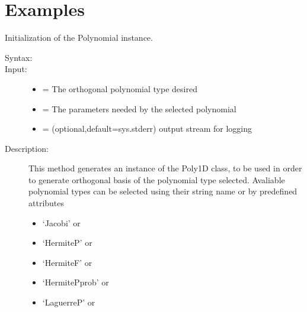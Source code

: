 \documentclass[letterpaper,10pt,english]{sphinxmanual}
\begin{document}
\chapter{Examples}
\label{index:examples}

\begin{fulllineitems}
\label{index:SpectralToolbox.Spectral1D.Poly1D}
Initialization of the Polynomial instance.
\begin{description}
\item[{Syntax:}] \leavevmode
{}

\item[{Input:}] \leavevmode\begin{itemize}
\item {} 
 = The orthogonal polynomial type desired

\item {} 
 = The parameters needed by the selected polynomial

\item {} 
 = (optional,default=sys.stderr) output stream for logging

\end{itemize}

\item[{Description:}] \leavevmode
This method generates an instance of the Poly1D class, to be used in order to generate
orthogonal basis of the polynomial type selected. Avaliable polynomial types can be
selected using their string name or by predefined attributes
\begin{itemize}
\item {} 
`Jacobi' or 

\item {} 
`HermiteP' or 

\item {} 
`HermiteF' or 

\item {} 
`HermitePprob' or 

\item {} 
`LaguerreP' or 


\end{itemize}
\end{description}
\end{fulllineitems}
\end{document}
